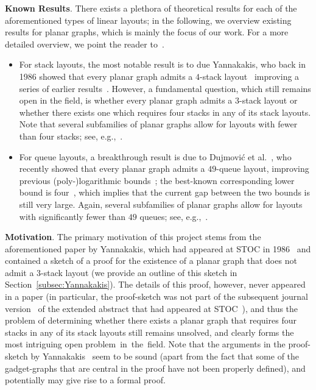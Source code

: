 \documentclass[runningheads]{llncs}
\newcommand{\myparagraph}[1]{\medskip\noindent\textbf{#1}.}
\begin{document}
\myparagraph{Known Results} There exists a plethora of theoretical results for each of the aforementioned types of linear layouts; in the following, we overview existing results for planar graphs, which is mainly the focus of our work. For a more detailed overview, we point the reader to~\cite{DBLP:journals/dmtcs/DujmovicW04}. 
%
\begin{itemize}[--]
\item For stack layouts, the most notable result is to due Yannakakis, who back in 1986 showed that every planar graph admits a $4$-stack layout~\cite{DBLP:conf/stoc/Yannakakis86,DBLP:journals/jcss/Yannakakis89} improving a series of earlier results~\cite{DBLP:conf/stoc/BussS84,DBLP:conf/focs/Heath84,Istrail1988a}. However, a fundamental question, which still remains open in the field, is whether every planar graph admits a $3$-stack layout or whether there exists one which requires four stacks in any of its stack layouts. Note that several subfamilies of planar graphs allow for layouts with fewer than four stacks; see, e.g.,~\cite{DBLP:journals/algorithmica/BekosGR16,DBLP:journals/jct/BernhartK79,DBLP:journals/mp/CornuejolsNP83,DBLP:journals/dcg/FraysseixMP95,Ewald1973,DBLP:conf/focs/Heath84,DBLP:journals/appml/KainenO07,NC08,DBLP:conf/cocoon/RengarajanM95}. 
\item For queue layouts, a breakthrough result is due to Dujmovi\'c et al.~\cite{constant}, who recently showed that every planar graph admits a $49$-queue layout, improving previous (poly-)logarithmic bounds~\cite{DBLP:journals/corr/BannisterDDEW18,DBLP:journals/jgaa/DujmovicF18,DBLP:journals/siamcomp/BattistaFP13}; the best-known corresponding lower bound is four~\cite{DBLP:conf/gd/AlamBG0P18}, which implies that the current gap between the two bounds is still very large. Again, several subfamilies of planar graphs allow for layouts with significantly fewer than $49$ queues; see, e.g.,~\cite{DBLP:conf/gd/AlamBG0P18,Ganley95,DBLP:journals/siamdm/HeathLR92,DBLP:journals/siamcomp/HeathR92,DBLP:conf/cocoon/RengarajanM95}.%
\end{itemize}
%
\myparagraph{Motivation} The primary motivation of this project stems from the aforementioned paper by Yannakakis, which had appeared at STOC in 1986~\cite{DBLP:conf/stoc/Yannakakis86} and contained a sketch of a proof for the existence of a planar graph that does not admit a $3$-stack layout (we provide an outline of this sketch in Section~\ref{subsec:Yannakakis}). The details of this proof, however, never appeared in a paper (in particular, the proof-sketch was not part of the subsequent journal version~\cite{DBLP:journals/jcss/Yannakakis89} of the extended abstract that had appeared at STOC~\cite{DBLP:conf/stoc/Yannakakis86}), and thus the problem of determining whether there exists a planar graph that requires four stacks in any of its stack layouts still remains unsolved, and clearly forms the most intriguing open problem~in~the~field. Note that the arguments in the proof-sketch by Yannakakis~\cite{DBLP:conf/stoc/Yannakakis86} seem to be sound (apart from the fact that some of the gadget-graphs that are central in the proof have not been properly defined), and potentially may give rise to a formal proof. 
\end{document}
